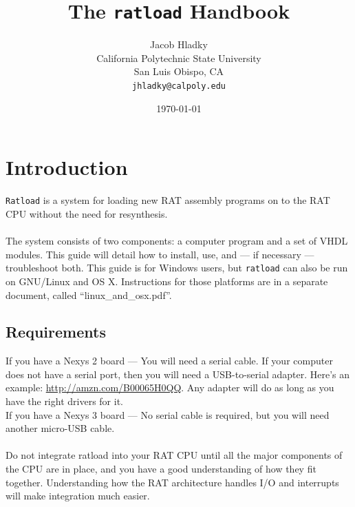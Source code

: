 \documentclass[notitlepage]{article}
\makeatletter
\newcommand*{\toccontents}{\@starttoc{toc}}
\makeatother
\begin{document}
\title{\huge{The \texttt{ratload} Handbook}}
\author{
  Jacob Hladky\\
  California Polytechnic State University\\
  San Luis Obispo, CA\\
  \texttt{jhladky@calpoly.edu}
}
\date{\today}
\maketitle

\toccontents


\section{Introduction}
\texttt{Ratload} is a system for loading new RAT assembly programs on to the RAT CPU without the need for resynthesis.\\\\
The system consists of two components: a computer program and a set of VHDL modules. This guide will detail how to install, use, and --- if necessary --- troubleshoot both. This guide is for Windows users, but \texttt{ratload} can also be run on GNU/Linux and OS X. Instructions for those platforms are in a separate document, called ``linux\_and\_osx.pdf''.

\subsection{Requirements}
If you have a Nexys 2 board --- You will need a serial cable. If your computer does not have a serial port, then you will need a USB-to-serial adapter. Here's an example: \url{http://amzn.com/B00065H0QQ}. Any adapter will do as long as you have the right drivers for it.\\
If you have a Nexys 3 board --- No serial cable is required, but you will need another micro-USB cable.\\\\
Do not integrate ratload into your RAT CPU until all the major components of the CPU are in place, and you have a good understanding of how they fit together. Understanding how the RAT architecture handles I/O and interrupts will make integration much easier.
\end{document}
